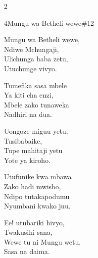 \documentclass{article}
\begin{document}
\begin{multicols}{2}
\begin{hymn}{4}{Mungu wa Betheli wewe}{\#12}
\begin{stanza}
Mungu wa Betheli wewe,\\
Ndiwe Mchungaji,\\
Ulichunga baba zetu,\\
Utuchunge vivyo.
\end{stanza}
\begin{stanza}
Tumefika sasa mbele\\
Ya kiti cha enzi,\\
Mbele zako tunaweka\\
Nadhiri na dua.
\end{stanza}
\begin{stanza}
Uongoze miguu yetu,\\
Tusibabaike,\\
Tupe mahitaji yetu\\
Yote ya kiroho.
\end{stanza}
\begin{stanza}
Utufunike kwa mbawa\\
Zako hadi mwisho,\\
Ndipo tutakapodumu\\
Nyumbani kwako juu.
\end{stanza}
\begin{stanza}
Ee! utubariki hivyo,\\
Twakusihi sana,\\
Wewe tu ni Mungu wetu,\\
Sasa na daima.
\end{stanza}
\end{hymn}


\end{multicols}
\end{document}

